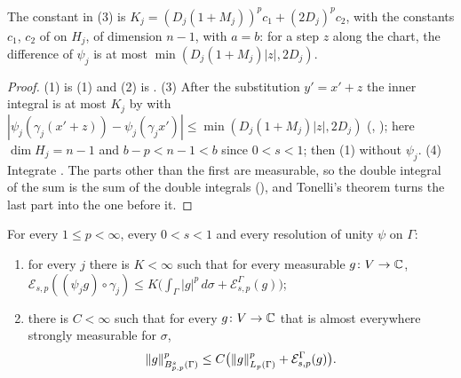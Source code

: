The constant in (3) is $K_j = (D_j (1 + M_j))^p c_1 + (2 D_j)^p c_2$, with the constants $c_1$,
$c_2$ of  on $H_j$, of dimension $n - 1$, with $a = b$: for
a step $z$ along the chart, the difference of $\psi_j$ is at most
$\min(D_j (1 + M_j) |z|, 2 D_j)$.

\begin{proof}
\leanok
(1) is (1) and (2) is
. (3) After
the substitution $y' = x' + z$ the inner integral is at most $K_j$ by
 with
$|\psi_j(\gamma_j(x' + z)) - \psi_j(\gamma_j x')| \leq \min(D_j (1 + M_j) |z|, 2 D_j)$
(, ); here
$\dim H_j = n - 1$ and $b - p < n - 1 < b$ since $0 < s < 1$; then (1) without $\psi_j$.
(4) Integrate . The parts other than the first are measurable,
so the double integral of the sum is the sum of the double integrals
(), and Tonelli's theorem turns the last part into the one
before it.
\end{proof}

\begin{theorem}
\label{thm:boundary-slobodeckij-lower}
\leanok
{}
For every $1 \leq p < \infty$, every $0 < s < 1$ and every resolution of unity $\psi$ on
$\Gamma$:
\begin{enumerate}
  \item for every $j$ there is $K < \infty$ such that for every measurable $g \colon V \to \mathbb{C}$,
    $\mathcal{E}_{s,p}((\psi_j g) \circ \gamma_j) \leq K \bigl(\int_\Gamma |g|^p \, d\sigma
    + \mathcal{E}^\Gamma_{s,p}(g)\bigr)$;
  \item there is $C < \infty$ such that for every $g \colon V \to \mathbb{C}$ that is almost everywhere
    strongly measurable for $\sigma$,
    \[
      \|g\|_{B^{s}_{p,p}(\Gamma)}^p \leq C \bigl( \|g\|_{L_p(\Gamma)}^p
        + \mathcal{E}^\Gamma_{s,p}(g) \bigr) .
    \]
\end{enumerate}
\end{theorem}

